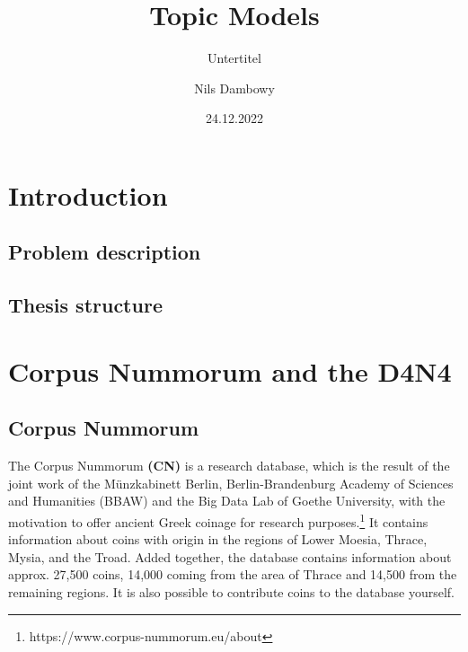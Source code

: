 \documentclass[english]{ttlab-qualify}
\begin{document}
\titlehead{
  \textbf{Goethe University}\\
  \textbf{Institute for Informatics}\\
  \textbf{Databases and Information Systems (DBIS)}
}
\subject{Bachelor Thesis}
\author{Nils Dambowy}
\title{Topic Models}
\subtitle{Untertitel}
\date{24.12.2022}
\publishers{Supervised by \\ Dr. Karsten Tolle\\ Sebastian Grampe}

\maketitle
\tableofcontents

\chapter{Introduction}    
\section{Problem description}
\section{Thesis structure}

\chapter{Corpus Nummorum and the D4N4}
\section{Corpus Nummorum}
The Corpus Nummorum \textbf{(CN)} is a  research database, which is  the result of the joint work of the Münzkabinett Berlin, Berlin-Brandenburg Academy of Sciences and Humanities (BBAW) and the Big Data Lab of Goethe University, with the motivation to offer ancient Greek coinage for research purposes.\footnote{https://www.corpus-nummorum.eu/about}
It contains information about coins with origin in the regions of Lower Moesia, Thrace, Mysia, and the Troad. Added together, the database contains information about approx. 27,500 coins, 14,000 coming from the area of Thrace and 14,500 from the remaining regions. It is also possible to contribute coins to the database yourself.
\end{document}

